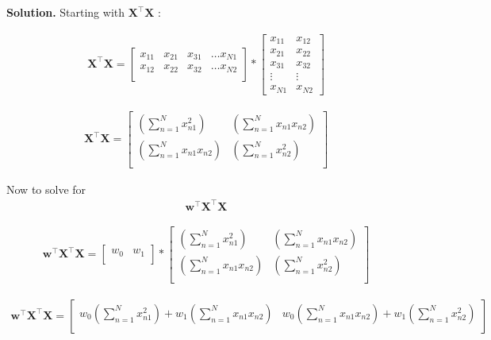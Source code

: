 \documentclass[10pt]{article}
\begin{document}
\begin{enumerate}
{\bf Solution.} Starting with $\mathbf{X}^\top\mathbf{X}$ :

\begin{eqnarray*}
\mathbf{X}^\top\mathbf{X} = 
    \begin{bmatrix}
    x_{11} & x_{21} & x_{31} & \hdots x_{N1} \\[0.3em]
    x_{12} & x_{22} & x_{32} & \hdots x_{N2} \\[0.3em]
    \end{bmatrix}
    *
    \begin{bmatrix}
    x_{11} & x_{12} \\[0.3em]
    x_{21} & x_{22} \\[0.3em]
    x_{31} & x_{32} \\[0.3em]
    \vdots & \vdots \\[0.3em]
    x_{N1} & x_{N2}
    \end{bmatrix}
\end{eqnarray*}


\begin{eqnarray*}
\mathbf{X}^\top\mathbf{X} = 
    \begin{bmatrix}
    \left( \sum_{n=1}^N x_{n1}^2 \right)  & \left( \sum_{n=1}^N x_{n1}x_{n2} \right) \\[0.3em]
    \left( \sum_{n=1}^N x_{n1}x_{n2} \right)  & \left( \sum_{n=1}^N x_{n2}^2 \right) \\[0.3em]
    \end{bmatrix}
\end{eqnarray*}

Now to solve for
\begin{eqnarray*}
\mathbf{w}^\top\mathbf{X}^\top\mathbf{X}
\end{eqnarray*}

\begin{eqnarray*}
\mathbf{w}^\top\mathbf{X}^\top\mathbf{X} = 
    \begin{bmatrix}
    w_0 & w_1 \\[0.3em]
    \end{bmatrix}
    *
    \begin{bmatrix}
    \left( \sum_{n=1}^N x_{n1}^2 \right)  & \left( \sum_{n=1}^N x_{n1}x_{n2} \right) \\[0.3em]
    \left( \sum_{n=1}^N x_{n1}x_{n2} \right)  & \left( \sum_{n=1}^N x_{n2}^2 \right) \\[0.3em]
    \end{bmatrix} 
\end{eqnarray*}

\begin{eqnarray*}
\mathbf{w}^\top\mathbf{X}^\top\mathbf{X} = 
    \begin{bmatrix}
    w_0 \left( \sum_{n=1}^N x_{n1}^2 \right) + w_1 \left( \sum_{n=1}^N x_{n1}x_{n2} \right) & w_0 \left( \sum_{n=1}^N x_{n1}x_{n2} \right) + w_1 \left( \sum_{n=1}^N x_{n2}^2 \right) \\[0.3em]
    \end{bmatrix}
\end{eqnarray*}


\end{enumerate}
\end{document}

